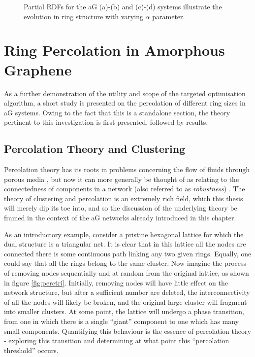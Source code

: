 \begin{figure}[bt]
     \caption{Partial RDFs for the aG (a)\--(b) and \zach{} (c)\--(d) systems illustrate the evolution in ring structure with varying $\alpha$ parameter.}
     \label{fig:toptrdf}
\end{figure}

\section{Ring Percolation in Amorphous Graphene}

As a further demonstration of the utility and scope of the targeted optimisation algorithm, a short study is presented on the percolation of different ring sizes in aG systems.
Owing to the fact that this is a standalone section, the theory pertinent to this investigation is first presented, followed by results.

\subsection{Percolation Theory and Clustering}
\label{s:percolationtheory}

Percolation theory has its roots in problems concerning the flow of fluids through porous media \cite{Broadbent1956}, but now it can more generally be thought of as relating to the connectedness of components in a network (also referred to as \textit{robustness}) \cite{Callaway2000}.
The theory of clustering and percolation is an extremely rich field, which this thesis will merely dip its toe into, and so the discussion of the underlying theory be framed in the context of the aG networks already introduced in this chapter.

As an introductory example, consider a pristine hexagonal lattice for which the dual structure is a triangular net.
It is clear that in this lattice all the nodes are connected \ie{} there is some continuous path linking any two given rings.
Equally, one could say that all the rings belong to the same cluster.
Now imagine the process of removing nodes sequentially and at random from the original lattice, as shown in figure \ref{fig:perctri}.
Initially, removing nodes will have little effect on the network structure, but after a sufficient number are deleted, the interconnectivity of all the nodes will likely be broken, and the original large cluster will fragment into smaller clusters.
At some point, the lattice will undergo a phase transition, from one in which there is a single ``giant'' component to one which has many small components.
Quantifying this behaviour is the essence of percolation theory \-- exploring this transition and determining at what point this ``percolation threshold'' occurs.

